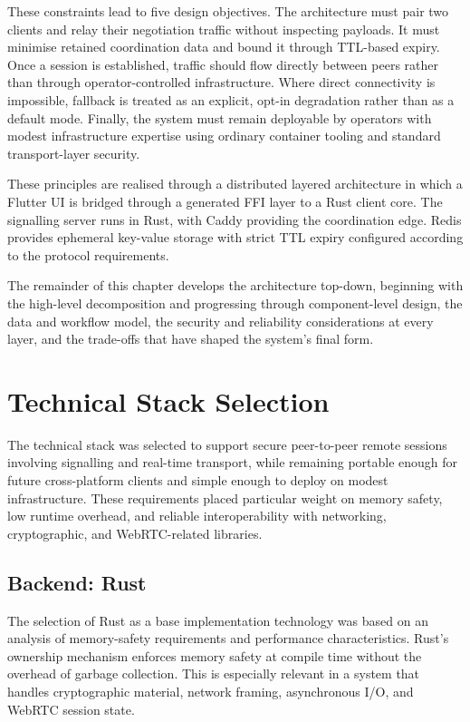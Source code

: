 \documentclass[12pt,a4paper,oneside]{report}
\begin{document}
These constraints lead to five design objectives. The architecture must pair two clients and relay their negotiation traffic without inspecting payloads. It must minimise retained coordination data and bound it through TTL-based expiry. Once a session is established, traffic should flow directly between peers rather than through operator-controlled infrastructure. Where direct connectivity is impossible, fallback is treated as an explicit, opt-in degradation rather than as a default mode. Finally, the system must remain deployable by operators with modest infrastructure expertise using ordinary container tooling and standard transport-layer security.

These principles are realised through a distributed layered architecture in which a Flutter UI is bridged through a generated FFI layer to a Rust client core. The signalling server runs in Rust, with Caddy providing the coordination edge. Redis provides ephemeral key-value storage with strict TTL expiry configured according to the protocol requirements.

The remainder of this chapter develops the architecture top-down, beginning with the high-level decomposition and progressing through component-level design, the data and workflow model, the security and reliability considerations at every layer, and the trade-offs that have shaped the system's final form.


\section{Technical Stack Selection}
\label{sec:tech-stack}

The technical stack was selected to support secure peer-to-peer remote sessions involving signalling and real-time transport, while remaining portable enough for future cross-platform clients and simple enough to deploy on modest infrastructure. These requirements placed particular weight on memory safety, low runtime overhead, and reliable interoperability with networking, cryptographic, and WebRTC-related libraries.

\subsection{Backend: Rust}
\label{sec:backend-rust}

The selection of Rust as a base implementation technology was based on an analysis of memory-safety requirements and performance characteristics. Rust's ownership mechanism enforces memory safety at compile time without the overhead of garbage collection. This is especially relevant in a system that handles cryptographic material, network framing, asynchronous I/O, and WebRTC session state.
\end{document}

